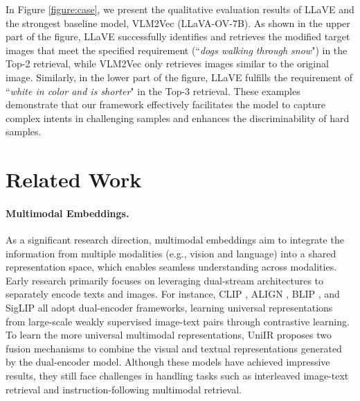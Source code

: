 \documentclass[11pt]{article}
\begin{document}
In Figure \ref{figure:case}, we present the qualitative evaluation results of LLaVE and the strongest baseline model, VLM2Vec (LLaVA-OV-7B). As shown in the upper part of the figure, LLaVE successfully identifies and retrieves the modified target images that meet the specified requirement (``\textit{dogs walking through snow}") in the Top-2 retrieval, while VLM2Vec only retrieves images similar to the original image. Similarly, in the lower part of the figure, LLaVE fulfills the requirement of ``\textit{white in color and is shorter}" in the Top-3 retrieval. These examples demonstrate that our framework effectively facilitates the model to capture complex intents in challenging samples and enhances the discriminability of hard samples.

\section{Related Work}

\paragraph{Multimodal Embeddings.}
As a significant research direction, multimodal embeddings aim to integrate the information from multiple modalities (e.g., vision and language) into a shared representation space, which enables seamless understanding across modalities.
Early research primarily focuses on leveraging dual-stream architectures to separately encode texts and images. For instance, CLIP \cite{CLIP}, ALIGN \cite{ALIGN}, BLIP \cite{BLIP}, and SigLIP \cite{SigLIP} all adopt dual-encoder frameworks, learning universal representations from large-scale weakly supervised image-text pairs through contrastive learning. To learn the more universal multimodal representations, UniIR \cite{Uniir} proposes two fusion mechanisms to combine the visual and textual representations generated by the dual-encoder model. Although these models have achieved impressive results, they still face challenges in handling tasks such as interleaved image-text retrieval \cite{DBLP:conf/cvpr/WuGGARGF21} and instruction-following multimodal retrieval.
\end{document}
